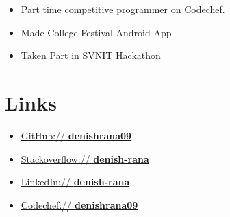 \documentclass[11pt,a4paper,sans]{moderncv}        %
\begin{document}
\vspace{6pt}

\begin{itemize}

\item{Part time competitive programmer on Codechef.}

\vspace{4pt}

\item{Made College Festival Android App }\vspace{6pt}

\item{Taken Part in SVNIT Hackathon }\vspace{6pt}

\end{itemize}


\section{Links}

\vspace{6pt}
 
\begin{itemize}

\item{\href{https://github.com/denishrana09}{GitHub:// \textbf{denishrana09}}}\vspace{4pt}

\item \href{https://stackoverflow.com/users/8018480/denish-rana}{Stackoverflow:// \textbf{denish-rana}}\vspace{4pt}
\item \href{https://www.linkedin.com/in/denish-rana/}{LinkedIn:// \textbf{denish-rana}}\vspace{6pt}
\item \href{https://www.codechef.com/users/denishrana09}{Codechef:// \textbf{denishrana09}}\vspace{4pt}

\end{itemize}

\nocite{*}

\end{document}
